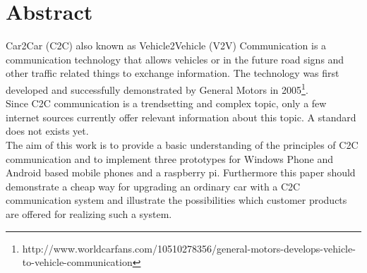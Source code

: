 \chapter{Abstract}
\label{cha:Abstract}
Car2Car (C2C) also known as Vehicle2Vehicle (V2V) Communication is a communication technology that allows vehicles or in the future road signs and other traffic related things to exchange information. The technology was first developed and successfully demonstrated by General Motors in 2005\footnote{http://www.worldcarfans.com/10510278356/general-motors-develops-vehicle-to-vehicle-communication}.
\\
Since C2C communication is a trendsetting and complex topic, only a few internet sources currently offer relevant information about this topic. A standard does not exists yet.\\
The aim of this work is to provide a basic understanding of the principles of C2C communication and to implement three prototypes for Windows Phone and Android based mobile phones and a raspberry pi. Furthermore this paper should demonstrate a cheap way for upgrading an ordinary car with a C2C communication system and illustrate the possibilities which customer products are offered for realizing such a system.
